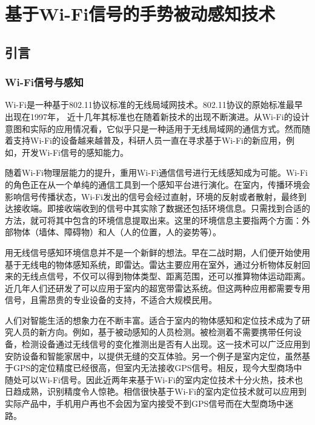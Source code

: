  \chapter {基于Wi-Fi信号的手势被动感知技术}

 \section{引言}

\subsection{Wi-Fi信号与感知}

Wi-Fi是一种基于802.11协议标准的无线局域网技术。802.11协议的原始标准最早出现在1997年， 近十几年其标准也在随着新技术的出现不断演进。从Wi-Fi的设计意图和实际的应用情况看，它似乎只是一种适用于无线局域网的通信方式。然而随着支持Wi-Fi的设备越来越普及，科研人员一直在寻求基于Wi-Fi的新应用，例如，开发Wi-Fi信号的感知能力。


随着Wi-Fi物理层能力的提升，重用Wi-Fi通信信号进行无线感知成为可能。Wi-Fi的角色正在从一个单纯的通信工具到一个感知平台进行演化。在室内，传播环境会影响信号传播状态，Wi-Fi发出的信号会经过直射，环境的反射或者散射，最终到达接收端。即接收端收到的信号中其实除了数据还包括环境信息。只需找到合适的方法，就可将其中包含的环境信息提取出来。这里的环境信息主要指两个方面：外部物体（墙体、障碍物）和人（人的位置，人的姿势等）。

用无线信号感知环境信息并不是一个新鲜的想法。早在二战时期，人们便开始使用基于无线电的物体感知系统，即雷达。雷达主要应用在室外，通过分析物体反射回来的无线点信号，不仅可以得到物体类型、距离范围，还可以推算物体运动距离。近几年人们还研发了可以应用于室内的超宽带雷达系统。但这两种应用都需要专用信号，且需昂贵的专业设备的支持，不适合大规模民用。


人们对智能生活的想象力在不断丰富。适合于室内的物体感知和定位技术成为了研究人员的新方向。例如，基于被动感知的人员检测。被检测着不需要携带任何设备，检测设备通过无线信号的变化推测出是否有人出现。这一技术可以广泛应用到安防设备和智能家居中，以提供无缝的交互体验。另一个例子是室内定位，虽然基于GPS的定位精度已经很高，但室内无法接收GPS信号。相反，现今大型商场中随处可以Wi-Fi信号。因此近两年来基于Wi-Fi的室内定位技术十分火热，技术也日趋成熟，识别精度令人惊艳。相信很快基于Wi-Fi的室内定位技术就可以应用到实际产品中，手机用户再也不会因为室内接受不到GPS信号而在大型商场中迷路。

